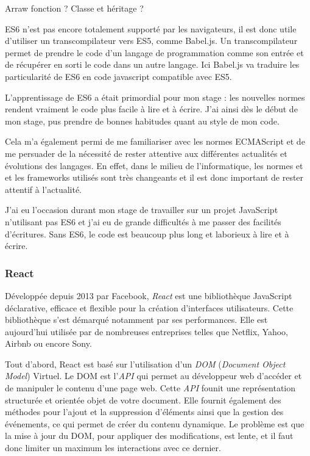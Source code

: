 Arraw fonction ? Classe et héritage ?

\bigskip

ES6 n'est pas encore totalement supporté par les navigateurs, il est
donc utile d'utiliser un transcompilateur vers ES5, comme Babel.js. Un
transcompilateur permet de prendre le code d'un langage de programmation
comme son entrée et de récupérer en sorti le code dans un autre langage.
Ici Babel.js va traduire les particularité de ES6 en code javascript
compatible avec ES5.

\bigskip

L'apprentissage de ES6 a était primordial pour mon stage : les nouvelles
normes rendent vraiment le code plus facile à lire et à écrire. J'ai
ainsi dès le début de mon stage, pus prendre de bonnes habitudes quant
au style de mon code.

\bigskip

Cela m'a également permi de me familiariser avec les normes ECMAScript
et de me persuader de la nécessité de rester attentive aux différentes
actualités et évolutions des langages. En effet, dans le milieu de
l'informatique, les normes et et les frameworks utilisés sont très
changeants et il est donc important de rester attentif à l'actualité.

\bigskip

J'ai eu l'occasion durant mon stage de travailler sur un projet
JavaScript n'utilisant pas ES6 et j'ai eu de grande difficultés à me
passer des facilités d'écritures. Sans ES6, le code est beaucoup plus
long et laborieux à lire et à écrire.

\bigskip

\subsubsection{React}\label{react}

\bigskip

Développée depuis 2013 par Facebook, \emph{React} est une bibliothèque
JavaScript déclarative, efficace et flexible pour la création
d'interfaces utilisateurs. Cette bibliothèque s'est démarqué notamment
par ses performances. Elle est aujourd'hui utilisée par de nombreuses
entreprises telles que Netflix, Yahoo, Airbnb ou encore Sony.

\bigskip

Tout d'abord, React est basé sur l'utilisation d'un \emph{DOM}
(\emph{Document Object Model}) Virtuel. Le DOM est l'\emph{API} qui
permet au développeur web d'accéder et de manipuler le contenu d'une
page web. Cette \emph{API} founit une représentation structurée et
orientée objet de votre document. Elle fournit également des méthodes
pour l'ajout et la suppression d'éléments ainsi que la gestion des
événements, ce qui permet de créer du contenu dynamique. Le problème est
que la mise à jour du DOM, pour appliquer des modifications, est lente,
et il faut donc limiter un maximum les interactions avec ce dernier.

